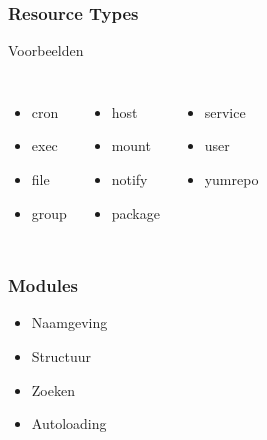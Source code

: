 \documentclass{beamer}
\begin{document}
\begin{frame}
\frametitle{Resource Types}
\begin{block}{Voorbeelden}
\begin{columns}[t]
\begin{itemize}
	\item cron
	\item exec
	\item file
	\item group
\end{itemize}
\begin{itemize}
	\item host
	\item mount
	\item notify
	\item package
\end{itemize}
\begin{itemize}
	\item service
	\item user
	\item yumrepo
\end{itemize}
\end{columns}
\end{block}
\end{frame}

\begin{frame}
\frametitle{Modules}
\begin{block}{}
\begin{itemize}
	\item Naamgeving
	\item Structuur
	\item Zoeken
	\item Autoloading
\end{itemize}
\end{block}
\end{frame}
\end{document}
